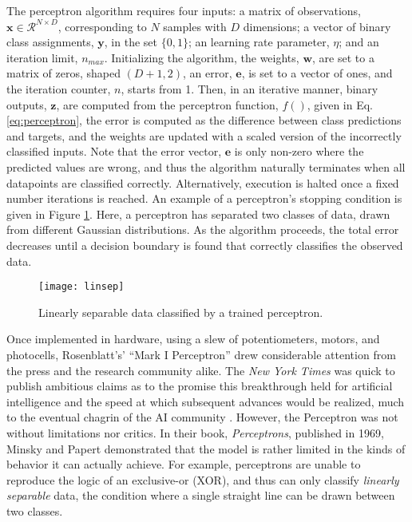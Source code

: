 \noindent The perceptron algorithm requires four inputs:
a matrix of observations, $\mathbf{x} \in \mathcal{R}^{N\times D}$, corresponding to $N$ samples with $D$ dimensions;
a vector of binary class assignments, $\mathbf{y}$, in the set $\{0, 1\}$;
an learning rate parameter, $\eta$;
and an iteration limit, $n_{max}$.
Initializing the algorithm, the weights, $\mathbf{w}$, are set to a matrix of zeros, shaped $(D + 1, 2)$, an error, $\mathbf{e}$, is set to a vector of ones, and the iteration counter, $n$, starts from 1.
Then, in an iterative manner, binary outputs, $\mathbf{z}$, are computed from the perceptron function, $f()$, given in Eq. \ref{eq:perceptron}, the error is computed as the difference between class predictions and targets, and the weights are updated with a scaled version of the incorrectly classified inputs.
Note that the error vector, $\mathbf{e}$ is only non-zero where the predicted values are wrong, and thus the algorithm naturally terminates when all datapoints are classified correctly.
Alternatively, execution is halted once a fixed number iterations is reached.
An example of a perceptron's stopping condition is given in Figure \ref{fig:linsep}.
Here, a perceptron has separated two classes of data, drawn from different Gaussian distributions.
As the algorithm proceeds, the total error decreases until a decision boundary is found that correctly classifies the observed data.

\begin{figure}
\begin{centering}
\texttt{[image: linsep]}
\caption{Linearly separable data classified by a trained perceptron.}
\label{fig:linsep}
\end{centering}
\end{figure}

Once implemented in hardware, using a slew of potentiometers, motors, and photocells, Rosenblatt's' ``Mark I Perceptron'' drew considerable attention from the press and the research community alike.
The \emph{New York Times} was quick to publish ambitious claims as to the promise this breakthrough held for artificial intelligence and the speed at which subsequent advances would be realized, much to the eventual chagrin of the AI community \cite{somebody}.
However, the Perceptron was not without limitations nor critics.
In their book, \emph{Perceptrons}, published in 1969, Minsky and Papert demonstrated that the model is rather limited in the kinds of behavior it can actually achieve.
For example, perceptrons are unable to reproduce the logic of an exclusive-or (XOR), and thus can only classify \emph{linearly separable} data, the condition where a single straight line can be drawn between two classes.


